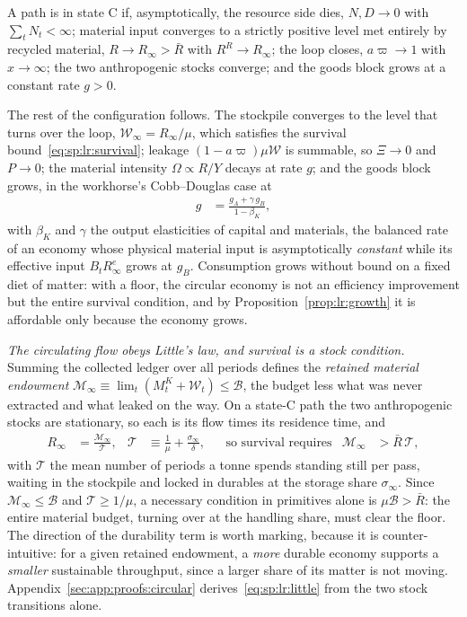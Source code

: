 \begin{definition}\label{def:lr:circular}
A path is in state C if, asymptotically, the resource side dies, $N,D\to0$ with $\sum_tN_t<\infty$; material input converges to a strictly positive level met entirely by recycled material, $R\to R_\infty>\bar R$ with $R^R\to R_\infty$; the loop closes, $a\varpi\to1$ with $x\to\infty$; the two anthropogenic stocks converge; and the goods block grows at a constant rate $g>0$.
\end{definition}

The rest of the configuration follows. The stockpile converges to the level that turns over the loop, $\mathcal W_\infty=R_\infty/\mu$, which satisfies the survival bound~\eqref{eq:sp:lr:survival}; leakage $\left(1-a\varpi\right)\mu\mathcal W$ is summable, so $\Xi\to0$ and $P\to0$; the material intensity $\Omega\propto R/Y$ decays at rate $g$; and the goods block grows, in the workhorse's Cobb--Douglas case at
\begin{align}
g &= \frac{g_A+\gamma\,g_B}{1-\beta_K},
\label{eq:sp:lr:c2-growth}
\end{align}
with $\beta_K$ and $\gamma$ the output elasticities of capital and materials, the balanced rate of an economy whose physical material input is asymptotically \emph{constant} while its effective input $B_tR^e_\infty$ grows at $g_B$. Consumption grows without bound on a fixed diet of matter: with a floor, the circular economy is not an efficiency improvement but the entire survival condition, and by Proposition~\ref{prop:lr:growth} it is affordable only because the economy grows.

\emph{The circulating flow obeys Little's law, and survival is a stock condition.} Summing the collected ledger over all periods defines the \emph{retained material endowment} $\mathcal M_\infty\equiv\lim_t\left(M^K_t+\mathcal W_t\right)\le\mathcal B$, the budget less what was never extracted and what leaked on the way. On a state-C path the two anthropogenic stocks are stationary, so each is its flow times its residence time, and
\begin{align}
R_\infty &= \frac{\mathcal M_\infty}{\mathcal T},
&
\mathcal T &\equiv \frac{1}{\mu}+\frac{\sigma_\infty}{\delta},
&&\text{so survival requires}
&
\mathcal M_\infty &> \bar R\,\mathcal T,
\label{eq:sp:lr:little}
\end{align}
with $\mathcal T$ the mean number of periods a tonne spends standing still per pass, waiting in the stockpile and locked in durables at the storage share $\sigma_\infty$. Since $\mathcal M_\infty\le\mathcal B$ and $\mathcal T\ge1/\mu$, a necessary condition in primitives alone is $\mu\mathcal B>\bar R$: the entire material budget, turning over at the handling share, must clear the floor. The direction of the durability term is worth marking, because it is counter-intuitive: for a given retained endowment, a \emph{more} durable economy supports a \emph{smaller} sustainable throughput, since a larger share of its matter is not moving. Appendix~\ref{sec:app:proofs:circular} derives~\eqref{eq:sp:lr:little} from the two stock transitions alone.

